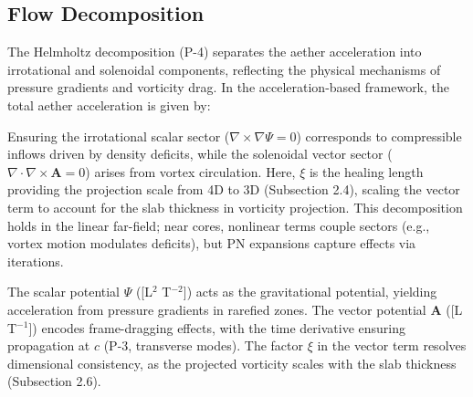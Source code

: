 \documentclass{article}
\begin{document}
\subsection{Flow Decomposition}

The Helmholtz decomposition (P-4) separates the aether acceleration into irrotational and solenoidal components, reflecting the physical mechanisms of pressure gradients and vorticity drag. In the acceleration-based framework, the total aether acceleration is given by:

\medskip
\noindent
{}
\medskip

Ensuring the irrotational scalar sector ($\nabla \times \nabla \Psi = 0$) corresponds to compressible inflows driven by density deficits, while the solenoidal vector sector ($\nabla \cdot \nabla \times \mathbf{A} = 0$) arises from vortex circulation. Here, $\xi$ is the healing length providing the projection scale from 4D to 3D (Subsection 2.4), scaling the vector term to account for the slab thickness in vorticity projection. This decomposition holds in the linear far-field; near cores, nonlinear terms couple sectors (e.g., vortex motion modulates deficits), but PN expansions capture effects via iterations.

The scalar potential $\Psi$ ([L$^2$ T$^{-2}$]) acts as the gravitational potential, yielding acceleration from pressure gradients in rarefied zones. The vector potential $\mathbf{A}$ ([L T$^{-1}$]) encodes frame-dragging effects, with the time derivative ensuring propagation at $c$ (P-3, transverse modes). The factor $\xi$ in the vector term resolves dimensional consistency, as the projected vorticity scales with the slab thickness (Subsection 2.6).
\end{document}
